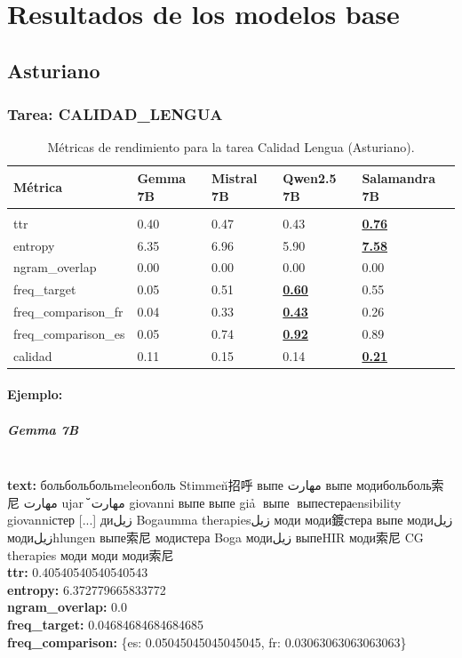 \chapter{Resultados de los modelos base}

\section{Asturiano}

\subsection{Tarea: CALIDAD\_LENGUA}\label{tarea-calidad_lengua}
\begin{longtable}[]{@{}lllll@{}}
\toprule\noalign{}
Métrica & Gemma 7B & Mistral 7B & Qwen2.5 7B & Salamandra 7B \\
\midrule\noalign{}
\endhead
\bottomrule\noalign{}
\caption{Métricas de rendimiento para la tarea Calidad Lengua (Asturiano).}
\label{tab:metricas_calidad_lengua_Asturiano}\\
\endlastfoot
ttr & 0.40 & 0.47 & 0.43 & \textbf{\underline{0.76}} \\
entropy & 6.35 & 6.96 & 5.90 & \textbf{\underline{7.58}} \\
ngram\_overlap & 0.00 & 0.00 & 0.00 & 0.00 \\
freq\_target & 0.05 & 0.51 & \textbf{\underline{0.60}} & 0.55 \\
freq\_comparison\_fr & 0.04 & 0.33 & \textbf{\underline{0.43}} & 0.26 \\
freq\_comparison\_es & 0.05 & 0.74 & \textbf{\underline{0.92}} & 0.89 \\
calidad & 0.11 & 0.15 & 0.14 & \textbf{\underline{0.21}} \\
\end{longtable}

\subsubsection{Ejemplo:}

\paragraph{Gemma 7B}~\\
\textbf{text:} больбольбольmeleonболь Stimmen̆招呼 выпе مهارت выпе модибольболь索尼 مهارت ujar🥈 مهارت̆ giovanni выпе выпе giả🥈 выпе🥈 выпестераensibility giovanniстер [...] диزيل Bogaumma therapiesزيل моди моди鍍стера выпе модиزيل модиزيلhlungen выпе索尼 модистера Boga модиزيل выпеHIR моди索尼 CG therapies моди моди моди索尼\\
\textbf{ttr:} 0.40540540540540543\\
\textbf{entropy:} 6.372779665833772\\
\textbf{ngram\_overlap:} 0.0\\
\textbf{freq\_target:} 0.04684684684684685\\
\textbf{freq\_comparison:} \{\textquotesingle{}es\textquotesingle{}: 0.05045045045045045, \textquotesingle{}fr\textquotesingle{}: 0.03063063063063063\}

